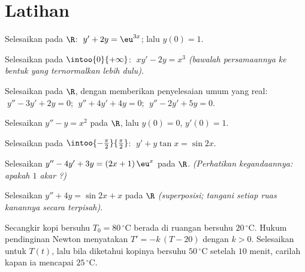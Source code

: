 \section{Latihan}

\begin{exercise}[$\star$]\label{exo:b1:diffeq:1}
Selesaikan pada $\R$: $\;y' + 2y = \eu^{3x}$; lalu  $y(0) =
1$.
\end{exercise}

\begin{exercise}[$\star$]\label{exo:b1:diffeq:2}
Selesaikan pada $\intoo{0}{+\infty}$: $\;x y' - 2y = x^3$ \emph{(bawalah
persamaannya ke bentuk yang ternormalkan lebih dulu)}.
\end{exercise}

\begin{exercise}[$\star$]\label{exo:b1:diffeq:3}
Selesaikan pada $\R$, dengan memberikan penyelesaian umum yang real:
$\;y'' - 3y' + 2y = 0$; $\;y'' + 4y' + 4y = 0$; $\;y'' - 2y' + 5y =
0$.
\end{exercise}

\begin{exercise}[$\star$]\label{exo:b1:diffeq:4}
Selesaikan $y'' - y = x^2$ pada $\R$, lalu  $y(0) = 0$,
$y'(0) = 1$.
\end{exercise}

\begin{exercise}[$\star\star$]\label{exo:b1:diffeq:5}
Selesaikan pada $\intoo{-\frac\pi2}{\frac\pi2}$:
$\;y' + y\tan x = \sin 2x$.
\end{exercise}

\begin{exercise}[$\star\star$]\label{exo:b1:diffeq:6}
Selesaikan $y'' - 4y' + 3y = (2x + 1)\,\eu^{x}$ pada $\R$. \emph{(Perhatikan
kegandaannya: apakah $1$ akar ?)}
\end{exercise}

\begin{exercise}[$\star\star$]\label{exo:b1:diffeq:7}
Selesaikan $y'' + 4y = \sin 2x + x$ pada $\R$ \emph{(superposisi; tangani
setiap ruas kanannya secara terpisah)}.
\end{exercise}

\begin{exercise}[$\star\star$]\label{exo:b1:diffeq:8}
Secangkir kopi bersuhu $T_0 = 80\,^\circ$C berada di ruangan bersuhu
$20\,^\circ$C. Hukum pendinginan Newton menyatakan $T' = -k\,(T - 20)$ dengan
$k > 0$. Selesaikan untuk $T(t)$, lalu bila diketahui kopinya bersuhu
$50\,^\circ$C setelah $10$ menit, carilah kapan ia mencapai
$25\,^\circ$C.
\end{exercise}

